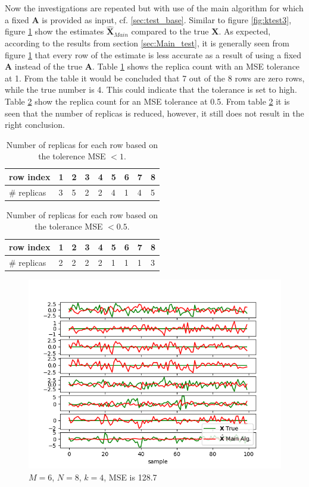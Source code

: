 Now the investigations are repeated but with use of the main algorithm for which a fixed $\textbf{A}$ is provided as input, cf. \ref{sec:test_base}.
Similar to figure \ref{fig:ktest3}, figure \ref{fig:ktest5} show the estimates $\hat{\textbf{X}}_{Main}$ compared to the true $\textbf{X}$. As expected, according to the results from section \ref{sec:Main_test}, it is generally seen from figure \ref{fig:ktest5} that every row of the estimate is less accurate as a result of using a fixed $\textbf{A}$ instead of the true $\textbf{A}$. Table \ref{tab:replica5} shows the replica count with an MSE tolerance at 1. From the table it would be concluded that 7 out of the 8 rows are zero rows, while the true number is 4. This could indicate that the tolerance is set to high. Table \ref{tab:replica6} show the replica count for an MSE tolerance at 0.5. From table \ref{tab:replica6} it is seen that the number of replicas is reduced, however, it still does not result in the right conclusion.  
\begin{table}[H]
\center
\begin{tabular}{|l|l|l|l|l|l|l|l|l|}
\hline
row index   & 1 & 2 & 3 & 4 & 5 & 6 & 7 & 8 \\ \hline
\# replicas & 3 & 5 & 2 & 2 & 4 & 1 & 4 & 5 \\ \hline
\end{tabular}
\caption{Number of replicas for each row based on the tolerence MSE $< 1$.}
\label{tab:replica5}
\end{table}
\noindent
\begin{table}[H]
\center
\begin{tabular}{|l|l|l|l|l|l|l|l|l|}
\hline
row index   & 1 & 2 & 3 & 4 & 5 & 6 & 7 & 8 \\ \hline
\# replicas & 2 & 2 & 2 & 2 & 1 & 1 & 1 & 3 \\ \hline
\end{tabular}
\caption{Number of replicas for each row based on the tolerance MSE $< 0.5$.}
\label{tab:replica6}
\end{table}
\noindent
\begin{figure}[H]
\centering
\includegraphics[scale=0.5]{figures/ch_estimate/k_test5.png}
\caption{$M=6$, $N=8$, $k=4$, MSE is 128.7}
\label{fig:ktest5}
\end{figure}
